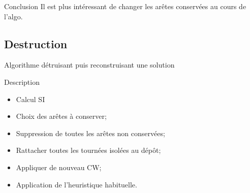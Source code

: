 \documentclass{beamer}
\begin{document}
\begin{frame}
\begin{exampleblock}{Conclusion}
Il est plus intéressant de changer les arêtes conservées au cours de l'algo.
\end{exampleblock}
\end{frame}



\subsection{Destruction}

\begin{frame}{Algorithme détruisant puis reconstruisant une solution}
\begin{block}{Description}
\begin{itemize}
\item Calcul SI
\item Choix des arêtes à conserver;
\item Suppression de toutes les arêtes non conservées;
\item Rattacher toutes les tournées isolées au dépôt;
\item Appliquer de nouveau CW;
\item Application de l'heuristique habituelle.
\end{itemize}
\end{block}

\end{frame}
\end{document}
